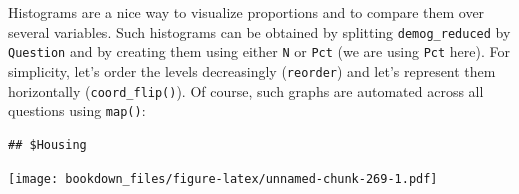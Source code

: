 \documentclass[
]{krantz}
\makeatletter
\newenvironment{Shaded}{\begin{snugshade}}{\end{snugshade}}
\newcommand{\AttributeTok}[1]{\textcolor[rgb]{0.61,0.61,0.61}{#1}}
\newcommand{\ControlFlowTok}[1]{\textcolor[rgb]{0.27,0.27,0.27}{\textbf{#1}}}
\newcommand{\DecValTok}[1]{\textcolor[rgb]{0.06,0.06,0.06}{#1}}
\newcommand{\FunctionTok}[1]{\textcolor[rgb]{0,0,0}{#1}}
\newcommand{\NormalTok}[1]{#1}
\newcommand{\OtherTok}[1]{\textcolor[rgb]{0.37,0.37,0.37}{#1}}
\newcommand{\SpecialCharTok}[1]{\textcolor[rgb]{0,0,0}{#1}}
\newcommand{\StringTok}[1]{\textcolor[rgb]{0.5,0.5,0.5}{#1}}
\newenvironment{kframe}{%
\medskip{}
\setlength{\fboxsep}{.8em}
 \def\at@end@of@kframe{}%
 \ifinner\ifhmode%
  \def\at@end@of@kframe{\end{minipage}}%
  \begin{minipage}{\columnwidth}%
 \fi\fi%
 \def\FrameCommand##1{\hskip\@totalleftmargin \hskip-\fboxsep
 \colorbox{shadecolor}{##1}\hskip-\fboxsep
     \hskip-\linewidth \hskip-\@totalleftmargin \hskip\columnwidth}%
 \MakeFramed {\advance\hsize-\width
   \@totalleftmargin\z@ \linewidth\hsize
   \@setminipage}}%
 {\par\unskip\endMakeFramed%
 \at@end@of@kframe}
\renewenvironment{Shaded}{\begin{kframe}}{\end{kframe}}
\makeatother
\begin{document}
Histograms are a nice way to visualize proportions and to compare them over several variables. Such histograms can be obtained by splitting \texttt{demog\_reduced} by \texttt{Question} and by creating them using either \texttt{N} or \texttt{Pct} (we are using \texttt{Pct} here). For simplicity, let's order the levels decreasingly (\texttt{reorder}) and let's represent them horizontally (\texttt{coord\_flip()}). Of course, such graphs are automated across all questions using \texttt{map()}:

\begin{Shaded}
\end{Shaded}

\begin{verbatim}
## $Housing
\end{verbatim}

\texttt{[image: bookdown\_files/figure-latex/unnamed-chunk-269-1.pdf]}
\end{document}
